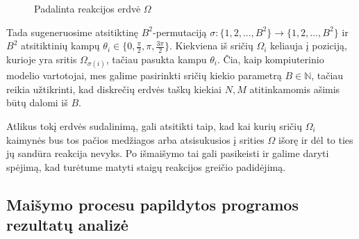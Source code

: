 \begin{figure}[!h]
\centering
\caption{Padalinta reakcijos erdvė $\Omega$}
\label{split-reaction-space}

\end{figure}

Tada sugeneruosime atsitiktinę $B^2$-permutaciją $\sigma: \{ 1, 2, \dots, B^2 \} \to \{ 1, 2, \dots, B^2 \} $ ir $B^2$ atsitiktinių kampų $\theta_i \in \{0, \frac{\pi}{2}, \pi, \frac{3\pi}{2}\}$. Kiekviena iš sričių $\Omega_i$ keliauja į poziciją, kurioje yra sritis $\Omega_{\sigma(i)}$, tačiau pasukta kampu $\theta_i$. Čia, kaip kompiuterinio modelio vartotojai, mes galime pasirinkti sričių kiekio parametrą $B\in\mathbb{N}$, tačiau reikia užtikrinti, kad diskrečių erdvės taškų kiekiai $N, M$ atitinkamomis ašimis būtų dalomi iš $B$. 

Atlikus tokį erdvės sudalinimą, gali atsitikti taip, kad kai kurių sričių $\Omega_i$ kaimynės bus tos pačios medžiagos arba atsisukusios į srities $\Omega$ išorę ir dėl to ties jų sandūra reakcija nevyks. Po išmaišymo tai gali pasikeisti ir galime daryti spėjimą, kad turėtume matyti staigų reakcijos greičio padidėjimą. 






\subsection{Maišymo procesu papildytos programos rezultatų analizė}

